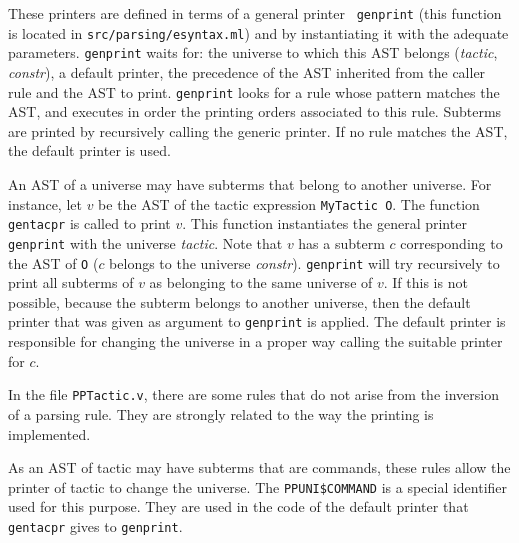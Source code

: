 These printers are defined in terms of a general printer {\tt
genprint} (this function is located in {\tt src/parsing/esyntax.ml})
and by instantiating it with the adequate parameters. {\tt genprint}
waits for: the universe to which this AST belongs ({\it tactic}, {\it
constr}), a default printer, the precedence of the AST inherited from
the caller rule and the AST to print. {\tt genprint} looks for a rule
whose pattern matches the AST, and executes in order the printing
orders associated to this rule. Subterms are printed by recursively
calling the generic printer. If no rule matches the AST, the default
printer is used.

An AST of a universe may have subterms that belong to another
universe. For instance, let $v$ be the AST of the tactic
expression \verb+MyTactic O+. The function {\tt gentacpr} is called
to print $v$.  This function instantiates the general printer {\tt
genprint} with the universe {\it tactic}. Note that $v$ has a subterm
$c$ corresponding to the AST of \verb+O+ ($c$ belongs to the universe
{\it constr}).  {\tt genprint} will try recursively to print all
subterms of $v$ as belonging to the same universe of $v$. If this is
not possible, because the subterm belongs to another universe, then
the default printer that was given as argument to {\tt genprint} is
applied. The default printer is responsible for changing the universe
in a proper way calling the suitable printer for $c$.

\medskip{} In the file
\verb+PPTactic.v+, there are some rules that do not arise from the
inversion of a parsing rule. They are strongly related to the way the
printing is implemented.


As an AST of tactic may have subterms that are commands, these rules
allow the printer of tactic to change the universe. The
\verb+PPUNI$COMMAND+ is a special identifier used for this
purpose. They are used in the code of the default printer that {\tt
gentacpr} gives to {\tt genprint}.



